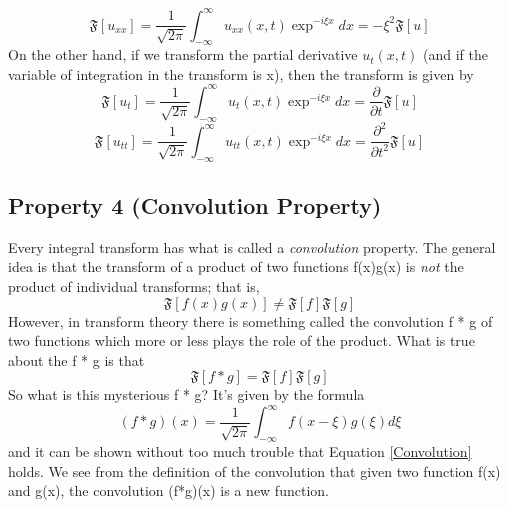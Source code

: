 \documentclass[a4paper,10pt]{article}
\numberwithin{equation}{section}
\numberwithin{figure}{section}
\theoremstyle{plain}
\begin{document}
\begin{displaymath}
 \mathfrak{F}[u_{xx}] = \frac{1}{\sqrt{2\pi}}\int_{-\infty}^{\infty} u_{xx}(x,t)\exp^{-i\xi x} dx =
-\xi^{2}\mathfrak{F}[u]
\end{displaymath}
On the other hand, if we transform the partial derivative $u_{t}(x,t)$ (and if the variable of integration
in the transform is x), then the transform is given by 
\begin{displaymath}
 \mathfrak{F}[u_{t}]= \frac{1}{\sqrt{2\pi}}\int_{-\infty}^{\infty} u_{t}(x,t)\exp^{-i\xi x} dx =
\frac{\partial}{\partial t}\mathfrak{F}[u]
\end{displaymath}
\begin{displaymath}
\mathfrak{F}[u_{tt}]= \frac{1}{\sqrt{2\pi}}\int_{-\infty}^{\infty} u_{tt}(x,t)\exp^{-i\xi x} dx = \frac{\partial^{2}}{\partial t^{2}}\mathfrak{F}[u]
\end{displaymath}
\subsection{Property 4 (Convolution Property)}
Every integral transform has what is called a \textit{convolution} property. The general idea is that
the transform of a product of two functions f(x)g(x) is \textit{not} the product of individual transforms;
that is, 
\begin{displaymath}
 \mathfrak{F}[f(x)g(x)] \neq \mathfrak{F}[f]\mathfrak{F}[g]
\end{displaymath}
However, in transform theory there is something called the convolution f * g of two functions
which more or less plays the role of the product. What is true about the f * g is that 
\begin{equation}\label{Convolution}
 \mathfrak{F}[f*g] = \mathfrak{F}[f]\mathfrak{F}[g]
\end{equation}
So what is this mysterious f * g? It's given by the formula
\begin{equation}\label{Conv}
 (f * g)(x) = \frac{1}{\sqrt{2\pi}}\int_{-\infty}^{\infty}f(x-\xi)g(\xi)d\xi
\end{equation}
and it can be shown without too much trouble that Equation \ref{Convolution} holds. We see from the definition
of the convolution that given two function f(x) and g(x), the convolution (f*g)(x) is a new function.
\end{document}
